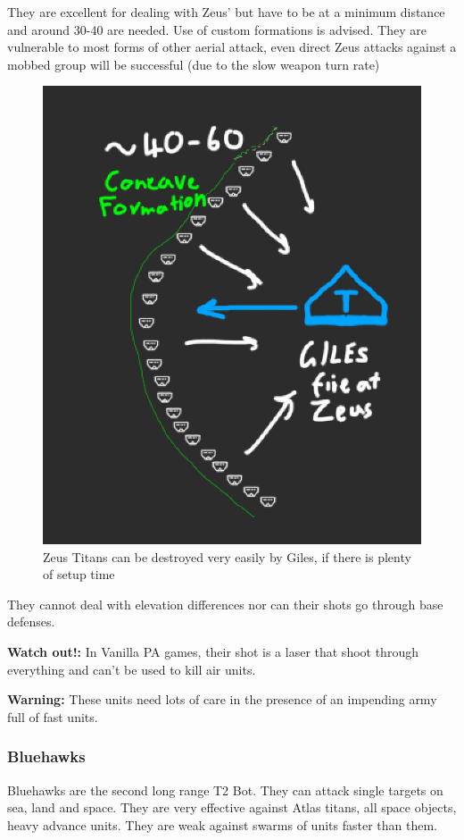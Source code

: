 \documentclass[]{article}
\begin{document}
They are excellent for dealing with Zeus' but have to be at a minimum distance and around 30-40 are needed.  Use of custom formations is advised. They are vulnerable to most forms of other aerial attack, even direct Zeus attacks against a mobbed group will be successful (due to the slow weapon turn rate)
\begin{figure}[h]
	\centering
	\includegraphics[width=0.7\linewidth]{ODQQ08a}
	\caption{Zeus Titans can be destroyed very easily by Giles, if there is plenty of setup time}
	\label{fig:odqq08a}
\end{figure}

They cannot deal with elevation differences nor can their shots go through base defenses.  


\textbf{Watch out!:} In Vanilla PA games, their shot is a laser that shoot through everything and can't be used to kill air units. 

\textbf{Warning:} These units need lots of care in the presence of an impending army full of fast units.  

\subsubsection{Bluehawks}

Bluehawks are the second long range T2 Bot.  They can attack single targets on sea, land and space.  They are very effective against Atlas titans, all space objects, heavy advance units.  They are weak against swarms of units faster than them.  
\end{document}
